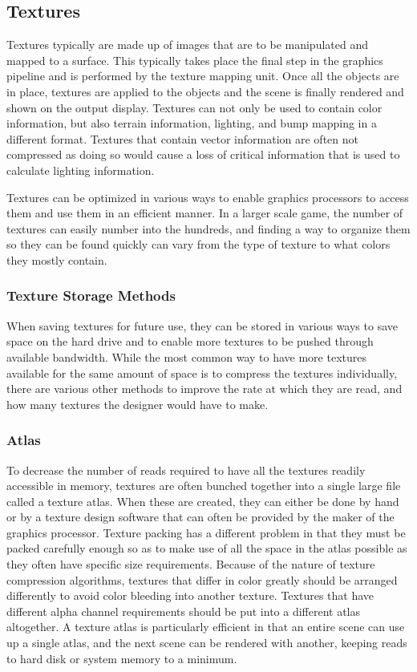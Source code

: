 \documentclass[12pt]{CPP}
\begin{document}
\subsection{Textures}
Textures typically are made up of images that are to be manipulated and mapped to a surface. This typically takes place the final step in the graphics pipeline and is performed by the texture mapping unit. Once all the objects are in place, textures are applied to the objects and the scene is finally rendered and shown on the output display. Textures can not only be used to contain color information, but also terrain information, lighting, and bump mapping in a different format. Textures that contain vector information are often not compressed as doing so would cause a loss of critical information that is used to calculate lighting information.

Textures can be optimized in various ways to enable graphics processors to access them and use them in an efficient manner. In a larger scale game, the number of textures can easily number into the hundreds, and finding a way to organize them so they can be found quickly can vary from the type of texture to what colors they mostly contain.

\subsubsection{Texture Storage Methods}
When saving textures for future use, they can be stored in various ways to save space on the hard drive and to enable more textures to be pushed through available bandwidth. While the most common way to have more textures available for the same amount of space is to compress the textures individually, there are various other methods to improve the rate at which they are read, and how many textures the designer would have to make.

\subsubsection{Atlas}
To decrease the number of reads required to have all the textures readily accessible in memory, textures are often bunched together into a single large file called a texture atlas. When these are created, they can either be done by hand or by a texture design software that can often be provided by the maker of the graphics processor. Texture packing has a different problem in that they must be packed carefully enough so as to make use of all the space in the atlas possible as they often have specific size requirements. Because of the nature of texture compression algorithms, textures that differ in color greatly should be arranged differently to avoid color bleeding into another texture. Textures that have different alpha channel requirements should be put into a different atlas altogether. A texture atlas is particularly efficient in that an entire scene can use up a single atlas, and the next scene can be rendered with another, keeping reads to hard disk or system memory to a minimum. \citep{Sherrod2008}
\end{document}
